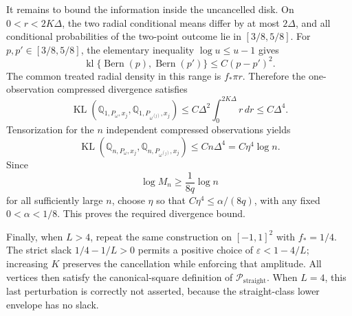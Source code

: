 It remains to bound the information inside the uncancelled disk.  On \(0<r<2K\Delta\), the two radial conditional means differ by at most \(2\Delta\), and all conditional probabilities of the two-point outcome lie in \([3/8,5/8]\).  For \(p,p'\in[3/8,5/8]\), the elementary inequality \(\log u\leq u-1\) gives
\[
 \operatorname{kl}\{\operatorname{Bern}(p),\operatorname{Bern}(p')\}
 \leq C(p-p')^2.
\]
The common treated radial density in this range is \(f_*\pi r\).  Therefore the one-observation compressed divergence satisfies
\[
 \operatorname{KL}\!\left(\mathbb Q_{1,P_\omega,x_j},
 \mathbb Q_{1,P_{\omega^{(j)}},x_j}\right)
 \leq C\Delta^2\int_0^{2K\Delta}r\,dr
 \leq C\Delta^4.
\]
Tensorization for the \(n\) independent compressed observations yields
\[
 \operatorname{KL}\!\left(\mathbb Q_{n,P_\omega,x_j},
 \mathbb Q_{n,P_{\omega^{(j)}},x_j}\right)
 \leq Cn\Delta^4=C\eta^4\log n.
\]
Since
\[
 \log M_n\geq\frac{1}{8q}\log n
\]
for all sufficiently large \(n\), choose \(\eta\) so that \(C\eta^4\leq\alpha/(8q)\), with any fixed \(0<\alpha<1/8\).  This proves the required divergence bound.

Finally, when \(L>4\), repeat the same construction on \([-1,1]^2\) with \(f_*=1/4\).  The strict slack \(1/4-1/L>0\) permits a positive choice of \(\varepsilon<1-4/L\); increasing \(K\) preserves the cancellation while enforcing that amplitude.  All vertices then satisfy the canonical-square definition of \(\mathcal P_{\mathrm{straight}}\).  When \(L=4\), this last perturbation is correctly not asserted, because the straight-class lower envelope has no slack.